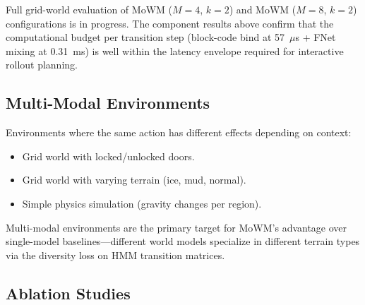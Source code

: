 \documentclass[journal]{IEEEtai}
\begin{document}
Full grid-world evaluation of MoWM ($M=4$, $k=2$) and MoWM ($M=8$, $k=2$) configurations is in progress. The component results above confirm that the computational budget per transition step (block-code bind at 57~$\mu$s + FNet mixing at 0.31~ms) is well within the latency envelope required for interactive rollout planning.

\subsection{Multi-Modal Environments}

Environments where the same action has different effects depending on context:
\begin{itemize}
\item Grid world with locked/unlocked doors.
\item Grid world with varying terrain (ice, mud, normal).
\item Simple physics simulation (gravity changes per region).
\end{itemize}

Multi-modal environments are the primary target for MoWM's advantage over single-model baselines---different world models specialize in different terrain types via the diversity loss on HMM transition matrices.

\subsection{Ablation Studies}
\end{document}
